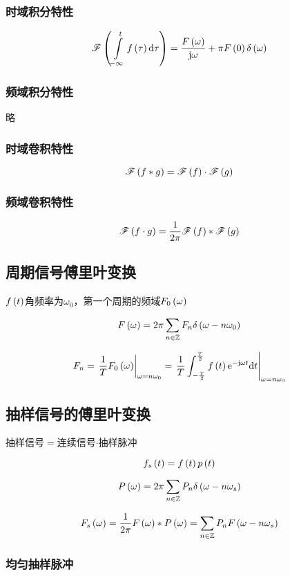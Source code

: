 \documentclass{article}
\begin{document}
\subsubsection{时域积分特性}

\[\mathscr F\left(\int\limits_{-\infty}^tf\left(\tau\right)\mathrm d\tau\right)=\frac{F\left(\omega\right)}{\mathrm j\omega}+\pi F\left(0\right)\delta\left(\omega\right)\]

\subsubsection{频域积分特性}

略

\subsubsection{时域卷积特性}

\[\mathscr F\left(f\ast g\right)=\mathscr F\left(f\right)\cdot\mathscr F\left(g\right)\]

\subsubsection{频域卷积特性}

\[\mathscr F\left(f\cdot g\right)=\frac1{2\pi}\mathscr F\left(f\right)\ast\mathscr F\left(g\right)\]

\subsection{周期信号傅里叶变换}

$f\left(t\right)$角频率为$\omega_0$，第一个周期的频域$F_0\left(\omega\right)$

\[F\left(\omega\right)=2\pi\sum_{n\in\mathbb Z} F_n\delta\left(\omega-n\omega_0\right)\]

\[F_n=\left.\frac1TF_0\left(\omega\right)\right|_{\omega=n\omega_0}=\left.\frac1T\int_{-\frac T2}^{\frac T2}f\left(t\right)\mathrm e^{-\mathrm j\omega t}\mathrm d t\right|_{\omega=n\omega_0}\]

\subsection{抽样信号的傅里叶变换}

抽样信号$=$连续信号$\cdot$抽样脉冲

\[f_s\left(t\right)=f\left(t\right) p\left(t\right)\]

\[P\left(\omega\right)=2\pi\sum_{n\in\mathbb Z} P_n\delta\left(\omega-n\omega_s\right)\]

\[F_s\left(\omega\right)=\frac1{2\pi}F\left(\omega\right)\ast P\left(\omega\right)=\sum_{n\in\mathbb Z} P_nF\left(\omega-n\omega_s\right)\]

\subsubsection{均匀抽样脉冲}
\end{document}
